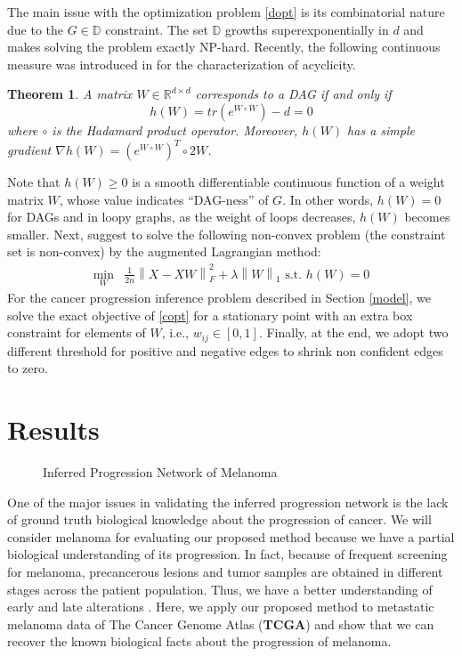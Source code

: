 \documentclass{bmcart}
\newtheorem{theorem}{Theorem}
\begin{document}
The main issue with the optimization problem \eqref{dopt} is its combinatorial nature due to the $G \in \mathbb{D}$ constraint. The set $\mathbb{D}$  growths superexponentially in $d$ and makes solving the problem exactly NP-hard. Recently, the following continuous measure was introduced in \cite{zheng2018dags} for the characterization of acyclicity.
\begin{theorem}\label{theorem:continuous-acyclicity}
	A matrix $W \in \mathbb{R}^{d \times d}$ corresponds to a DAG if and only if
	\begin{equation}
		h(W) = tr(e^{W \circ W}) - d = 0
	\end{equation}
	where $\circ$ is the Hadamard product operator. Moreover, $h(W)$ has a simple gradient $\nabla h(W) = \left(e^{W\circ W}\right)^T \circ 2W$.
\end{theorem}
Note that $h(W) \geq 0$ is a smooth differentiable continuous function of a weight matrix $W$, whose value indicates ``DAG-ness'' of $G$. In other words, $h(W) = 0$ for DAGs and in loopy graphs, as the weight of loops decreases, $h(W)$ becomes smaller. 
Next, \cite{zheng2018dags} suggest to solve the following non-convex problem (the constraint set is non-convex) by the augmented Lagrangian method:
\vspace{-8pt}
\begin{align}\label{copt}
	\min_W & \frac{1}{2n} \left\lVert X - XW \right\rVert_F^2 + \lambda \left\lVert W \right\rVert_1 \textrm{ s.t. } h(W) = 0
\end{align}
For the cancer progression inference problem described in Section \ref{model}, we solve the exact objective of \eqref{copt} for a stationary point with an extra box constraint for elements of $W$, i.e., $w_{ij} \in [0, 1]$. Finally, at the end, we adopt two different threshold for positive and negative edges to shrink non confident edges to zero.


\section{Results}
\begin{figure*}[ht]
	\vskip 0.2in
	\begin{center}
		\caption{Inferred Progression Network of Melanoma}
		\label{fig:melanoma}
	\end{center}
	\vskip -0.2in
\end{figure*}
One of the major issues in validating the inferred progression network is the lack of ground truth biological knowledge about the progression of cancer. We will consider melanoma for evaluating our proposed method because we have a partial biological understanding of its progression. In fact, because of frequent screening for melanoma, precancerous lesions and tumor samples are obtained in different stages across the patient population. Thus, we have a better understanding of early and late alterations \cite{shain2015genetic, akbani2015genomic}. Here, we apply our proposed method to metastatic melanoma data of The Cancer Genome Atlas (\textbf{TCGA}) \cite{Cancer_Genome_Atlas_Research_Network2013-ee} and show that we can recover the known biological facts about the progression of melanoma.
\end{document}

